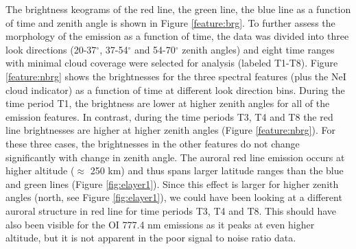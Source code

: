 \documentclass[crop=false,class=mitthesis,oneside,font=12pt]{standalone}
\begin{document}
The brightness keograms of the red line, the green line, the blue line as a function of time and zenith angle is shown in Figure \ref{feature:brg}. To further assess the morphology of the emission as a function of time, the data was divided into three look directions (20-37$^\circ$, 37-54$^\circ$ and 54-70$^\circ$ zenith angles) and eight time ranges with minimal cloud coverage were selected for analysis (labeled T1-T8).
Figure \ref{feature:nbrg} shows the brightnesses for the three spectral features (plus the NeI cloud indicator) as a function of time at different look direction bins. During the time period T1, the brightness are lower at higher zenith angles for all of the emission features. In contrast, during the time periods T3, T4 and T8 the red line brightnesses are higher at higher zenith angles (Figure \ref{feature:nbrg}). For these three cases, the brightnesses in the other features do not change significantly with change in zenith angle. The auroral red line emission occurs at higher altitude ($\approx$  250 km) and thus spans larger latitude ranges than the blue and green lines (Figure \ref{fig:elayer1}). Since this effect is larger for higher zenith angles (north, see Figure \ref{fig:elayer1}), we could have been looking at a different auroral structure in red line for time periods T3, T4 and T8. 
This should have also been visible for the OI 777.4 nm emissions as it peaks at even higher altitude, but it is not apparent in the poor signal to noise ratio data. 
\end{document}
